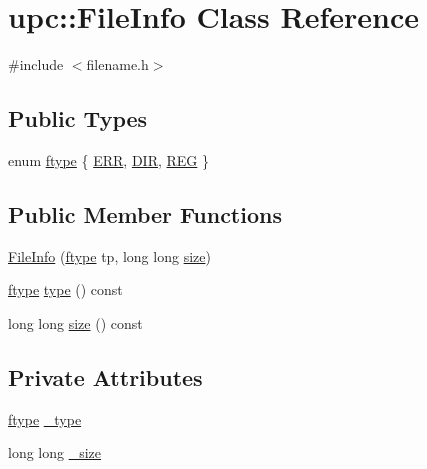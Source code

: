 \hypertarget{classupc_1_1FileInfo}{}\section{upc\+:\+:File\+Info Class Reference}
\label{classupc_1_1FileInfo}


{\ttfamily \#include $<$filename.\+h$>$}

\subsection*{Public Types}
\begin{DoxyCompactItemize}
\item 
enum \hyperlink{classupc_1_1FileInfo_a0d92d84fa1bd96c5e623e696ef484f38}{ftype} \{ \hyperlink{classupc_1_1FileInfo_a0d92d84fa1bd96c5e623e696ef484f38aafacba2155871d3d357b95920d987b1f}{E\+RR}, 
\hyperlink{classupc_1_1FileInfo_a0d92d84fa1bd96c5e623e696ef484f38aaa05780e3df0257e7affc677909e2e2f}{D\+IR}, 
\hyperlink{classupc_1_1FileInfo_a0d92d84fa1bd96c5e623e696ef484f38add423e388c6aee383f1bd6b420b31417}{R\+EG}
 \}
\end{DoxyCompactItemize}
\subsection*{Public Member Functions}
\begin{DoxyCompactItemize}
\item 
\hyperlink{classupc_1_1FileInfo_aa6b799f8194d7426f79b79ec88458e77}{File\+Info} (\hyperlink{classupc_1_1FileInfo_a0d92d84fa1bd96c5e623e696ef484f38}{ftype} tp, long long \hyperlink{classupc_1_1FileInfo_a312ce236409905ae3b0ebaa0c441511c}{size})
\item 
\hyperlink{classupc_1_1FileInfo_a0d92d84fa1bd96c5e623e696ef484f38}{ftype} \hyperlink{classupc_1_1FileInfo_a106f44feba768fb82672ded2b0337287}{type} () const 
\item 
long long \hyperlink{classupc_1_1FileInfo_a312ce236409905ae3b0ebaa0c441511c}{size} () const 
\end{DoxyCompactItemize}
\subsection*{Private Attributes}
\begin{DoxyCompactItemize}
\item 
\hyperlink{classupc_1_1FileInfo_a0d92d84fa1bd96c5e623e696ef484f38}{ftype} \hyperlink{classupc_1_1FileInfo_a61891fd0503949b6bb370556e2b8f3dc}{\+\_\+type}
\item 
long long \hyperlink{classupc_1_1FileInfo_ac09b1f0d020a595b0c6d5b582f5a1125}{\+\_\+size}
\end{DoxyCompactItemize}


